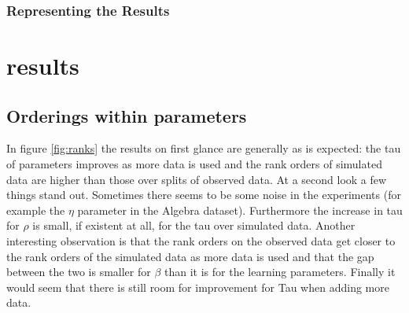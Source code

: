\documentclass{scrartcl}
\newcommand\todo[1]{\textit{\textcolor{red}{#1}}}
\begin{document}
\subsubsection{Representing the Results}

\section{results}
\subsection{Orderings within parameters}
In figure \ref{fig:ranks} the results on first glance are generally as is expected: the tau of parameters improves as more data is used and the rank orders of simulated data are higher than those over splits of observed data. At a second look a few things stand out. Sometimes there seems to be some noise in the experiments (for example the $\eta$ parameter in the Algebra dataset). Furthermore the increase in tau for $\rho$ is small, if existent at all, for the tau over simulated data. Another interesting observation is that the rank orders on the observed data get closer to the rank orders of the simulated data as more data is used and that the gap between the two is smaller for $\beta$ than it is for the learning parameters. Finally it would seem that there is still room for improvement for Tau when adding more data.
\end{document}
